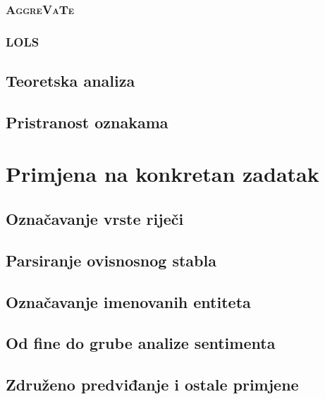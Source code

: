 \documentclass[times, utf8, diplomski]{fer}
\begin{document}
\subsection{\textsc{AggreVaTe}}

\subsection{\textsc{LOLS}}\label{ch:LOLS}


\section{Teoretska analiza}
\section{Pristranost oznakama}\label{ch:labelbias}


\chapter{Primjena na konkretan zadatak}

\section{Označavanje vrste riječi}


\section{Parsiranje ovisnosnog stabla}


\section{Označavanje imenovanih entiteta}

\section{Od fine do grube analize sentimenta}

\section{Združeno predviđanje i ostale primjene}

\end{document}
